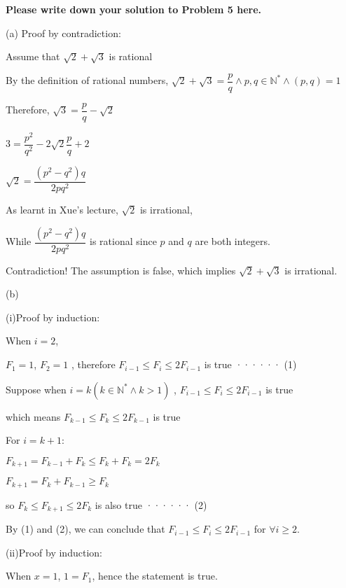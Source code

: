 \documentclass[11pt,twoside]{article}
\newenvironment{solution}{{\par\noindent\it Solution.}}{}
\begin{document}
\begin{solution}
\textbf{Please write down your solution to Problem 5 here.}

    \hspace*{\fill}

    (a)
    Proof by contradiction:
    
    Assume that $\sqrt{2} + \sqrt{3}$ is rational
    
    By the definition of rational numbers, $\sqrt{2} + \sqrt{3} = \dfrac{p}{q} \land p,q\in {\mathbb{N}^*} \land (p,q) = 1 $
    

    Therefore, $\sqrt{3} = \dfrac{p}{q} - \sqrt{2}$

    $ 3 = \dfrac{p^2}{q^2} - 2\sqrt{2} \dfrac{p}{q} +2 $

    $\sqrt{2} = \dfrac{(p^2-q^2)q}{2pq^2}$

    As learnt in Xue's lecture, $\sqrt{2}$ is irrational,

    While $\dfrac{(p^2-q^2)q}{2pq^2}$ is rational since $p$ and $q$ are both integers.

    Contradiction! The assumption is false, which implies $\sqrt{2} + \sqrt{3}$ is irrational.

    \hspace*{\fill}

    (b) 
    
    (i)Proof by induction:

    When $i = 2$, 
    
    $F_1 = 1$, $F_2 = 1$ , therefore $F_{i-1} \leq F_i \leq 2 F_{i-1}$ is true ······ (1)

    Suppose when $i = k ( k \in {\mathbb{N}^*} \land k > 1)$ , $F_{i-1} \leq F_i \leq 2 F_{i-1}$ is true

    which means $F_{k-1} \leq F_k \leq 2 F_{k-1}$ is true

    For $i = k + 1$:

    $F_{k+1} = F_{k-1}+F_{k} \leq F_k + F_k = 2F_k$

    $F_{k+1} = F_k + F_{k-1} \geq F_k$

    so $F_{k} \leq F_{k+1} \leq 2 F_{k}$ is also true  ······ (2)

    By (1) and (2), we can conclude that $F_{i-1} \leq F_i \leq 2 F_{i-1}$ for $\forall i \geq 2$.

    \hspace*{\fill}

    (ii)Proof by induction:

    When $x = 1$, $ 1 = F_1 $, hence the statement is true.


\end{solution}
\end{document}

